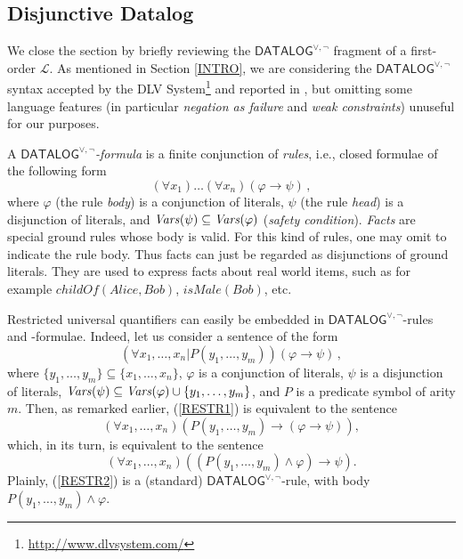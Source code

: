 \documentclass[manyauthors]{fundam}
\newcommand{\DisjDatalog}{\ensuremath{\mathsf{DATALOG}^{\vee,\neg}}\xspace}
\newcommand{\Lang}{\ensuremath{\mathcal{L}\xspace}} %
\begin{document}
\subsection{Disjunctive Datalog}

We close the section by briefly reviewing the \DisjDatalog 
fragment of a first-order $\Lang$. As mentioned in Section \ref{INTRO}, we are
considering the \DisjDatalog syntax accepted by
the DLV System\footnote{\url{http://www.dlvsystem.com/}} and reported
in \cite{LeoPfeFabEitGotPerSca2006}, but omitting some language features (in
particular \emph{negation as failure} and \emph{weak constraints}) unuseful for
our purposes.

A \emph{\DisjDatalog-formula} is a finite
conjunction of \emph{rules}, i.e., closed formulae of the following
form
\[
  (\forall x_1)\ldots(\forall x_n)(\varphi \rightarrow \psi)\,, \]
%
where $\varphi$ (the rule \emph{body}) is a conjunction of literals,
$\psi$ (the rule \emph{head}) is a disjunction of literals, and
$\mathit{Vars}(\psi) \subseteq \mathit{Vars}(\varphi)$ (\emph{safety 
condition}).
\emph{Facts} are special ground rules whose body is valid.  For
this kind of rules, one may omit to indicate the rule body.  Thus
facts can just be regarded as disjunctions of ground literals.  They
are used to express facts about real world items, such as for example
$\mathit{childOf}(\mathit{Alice}, \mathit{Bob})$, 
$\mathit{isMale}(\mathit{Bob})$, etc.

Restricted universal quantifiers
can easily be embedded  in \DisjDatalog-rules and -formulae.
Indeed, let us consider a sentence of the form
\begin{equation}\label{RESTR1}
  (\forall x_1, \ldots, x_n | P(y_1, \ldots, y_m))(\varphi \rightarrow
  \psi)\,,
\end{equation}
where $\{y_1, \ldots, y_m\} \subseteq \{x_1, \ldots, x_n\}$, 
$\varphi$ is a conjunction of literals, $\psi$ is a disjunction
of literals, $\mathit{Vars}(\psi) \subseteq \mathit{Vars}(\varphi) \cup
\{y_{1},\ldots,y_{m}\}$, and $P$ is a predicate symbol of arity $m$.
Then, as remarked earlier, (\ref{RESTR1}) is equivalent to the sentence
\[
  (\forall x_1, \ldots, x_n)(P(y_1, \ldots, y_m) \rightarrow (\varphi
  \rightarrow \psi)),
\]
which, in its turn, is equivalent to the sentence
\begin{equation}\label{RESTR2}
  (\forall x_1, \ldots, x_n)((P(y_1, \ldots, y_m) \wedge \varphi)
  \rightarrow \psi).
\end{equation}
Plainly, (\ref{RESTR2}) is a (standard) $\DisjDatalog$-rule, with body
$P(y_1, \ldots, y_m) \wedge \varphi$.
\end{document}
